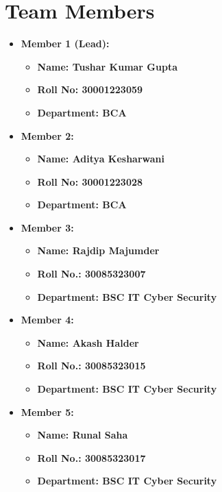 \documentclass[a4paper,15pt]{article}
\begin{document}
\section*{Team Members}
\begin{itemize}[leftmargin=1.5cm]
    \item \textbf{Member 1 (Lead):} 
    \begin{itemize}[leftmargin=1.5cm]
        \item \textbf{Name: Tushar Kumar Gupta} 
        \item \textbf{Roll No: 30001223059}
        \item \textbf{Department: BCA} 
\end{itemize}

    \item \textbf{Member 2:} 
    \begin{itemize}[leftmargin=1.5cm]
        \item \textbf{Name: Aditya Kesharwani } 
        \item \textbf{Roll No: 30001223028 } 
        \item \textbf{Department: BCA } 
    \end{itemize}

    \item \textbf{Member 3:} 
    \begin{itemize}[leftmargin=1.5cm]
        \item \textbf{Name: Rajdip Majumder} 
        \item \textbf{Roll No.: 30085323007} 
        \item \textbf{Department: BSC IT Cyber Security} 
    \end{itemize}

    \item \textbf{Member 4:} 
    \begin{itemize}[leftmargin=1.5cm]
        \item \textbf{Name: Akash Halder} 
        \item \textbf{Roll No.: 30085323015 } 
        \item \textbf{Department: BSC IT Cyber Security} 
    \end{itemize}

    \item \textbf{Member 5:} 
    \begin{itemize}[leftmargin=1.5cm]
        \item \textbf{Name: Runal Saha} 
        \item \textbf{Roll No.: 30085323017} 
        \item \textbf{Department: BSC IT Cyber Security}
\end{itemize}


\end{itemize}
\end{document}
